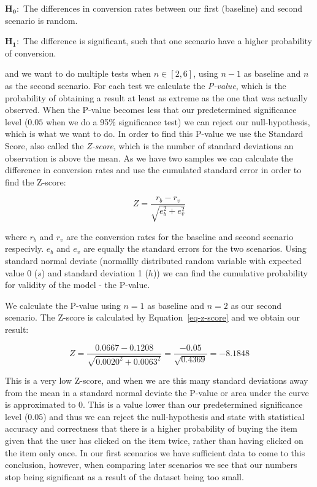 $\mathbf{H_0:}$ The differences in conversion rates between our first
(baseline) and second scenario is random.

$\mathbf{H_1:}$ The difference is significant, such that one scenario have a
higher probability of conversion.

and we want to do multiple tests when $n \in [2,6]$, using $n-1$ as baseline
and $n$ as the second scenario. For each test we calculate the
\textit{P-value}, which is the probability of obtaining a result at least as
extreme as the one that was actually observed. When the P-value becomes less
that our predetermined significance level ($0.05$ when we do a 95\%
significance test) we can reject our null-hypothesis, which is what we want to
do. In order to find this P-value we use the Standard Score, also called the
\textit{Z-score}, which is the number of standard deviations an observation is
above the mean. As we have two samples we can calculate the difference in
conversion rates and use the cumulated standard error in order to find the
Z-score:

\begin{equation}
  \label{eq-z-score}
  Z = \frac{r_b - r_v}{\sqrt{e_{b}^{2} + e_{v}^{2}}}
\end{equation}

where $r_b$ and $r_v$ are the conversion rates for the baseline and second
scenario respecivly. $e_b$ and $e_v$ are equally the standard errors for the
two scenarios. Using standard normal deviate (normallly distributed random
variable with expected value 0 ($s$) and standard deviation 1 ($h$)) we can
find the cumulative probability for validity of the model - the P-value.

We calculate the P-value using $n=1$ as baseline and $n=2$ as our second
scenario. The Z-score is calculated by Equation~\ref{eq-z-score} and we obtain
our result:

\begin{equation}
  Z = \frac{0.0667-0.1208}{\sqrt{0.0020^2 + 0.0063^2}} = \frac{-0.05}{\sqrt{0.4369}} = -8.1848
\end{equation}

This is a very low Z-score, and when we are this many standard deviations away
from the mean in a standard normal deviate the P-value or area under the curve
is approximated to 0. This is a value lower than our predetermined significance
level ($0.05$) and thus we can reject the null-hypothesis and state with
statistical accuracy and correctness that there is a higher probability of
buying the item given that the user has clicked on the item twice, rather than
having clicked on the item only once. In our first scenarios we have sufficient
data to come to this conclusion, however, when comparing later scenarios we see
that our numbers stop being significant as a result of the dataset being too
small.

